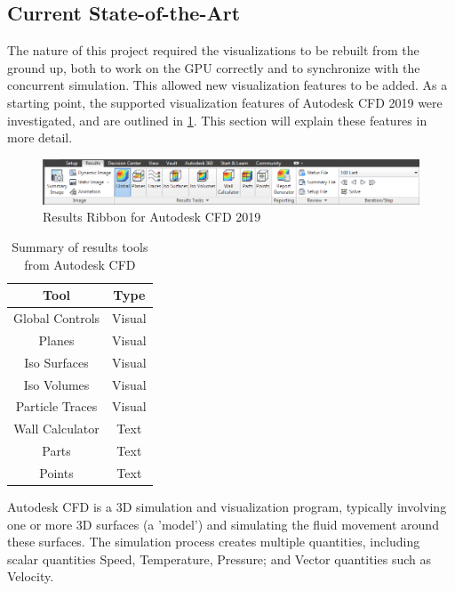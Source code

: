 \pagebreak
\subsection{Current State-of-the-Art}
The nature of this project required the visualizations to be rebuilt from the ground up, both to work on the GPU correctly and to synchronize with the concurrent simulation.
This allowed new visualization features to be added.
As a starting point, the supported visualization features of Autodesk CFD 2019 were investigated, and are outlined in \cref{tab:AutodeskCFDSummary}.
This section will explain these features in more detail.

\begin{figure}[ht]
    \centering
    \includegraphics[width=\linewidth]{Ch20Research/figures/results_ribbon.png}
    \caption{Results Ribbon for Autodesk CFD 2019\cite[Results Visualization]{AutodeskCFDManual}}
    \label{fig:AutodeskCFDRibbon}
\end{figure}

\begin{table}[ht]
    \centering
    \begin{tabular}{c|c}
        Tool & Type \\
        \hline
        Global Controls & Visual \\
        Planes & Visual \\
        Iso Surfaces & Visual \\
        Iso Volumes & Visual \\
        Particle Traces & Visual \\
        \hline
        Wall Calculator & Text \\
        Parts & Text \\
        Points & Text \\
    \end{tabular}
    \caption{Summary of results tools from Autodesk CFD}
    \label{tab:AutodeskCFDSummary}
\end{table}

Autodesk CFD is a 3D simulation and visualization program, typically involving one or more 3D surfaces (a 'model') and simulating the fluid movement around these surfaces.
The simulation process creates multiple quantities, including scalar quantities Speed, Temperature, Pressure; and Vector quantities such as Velocity.

